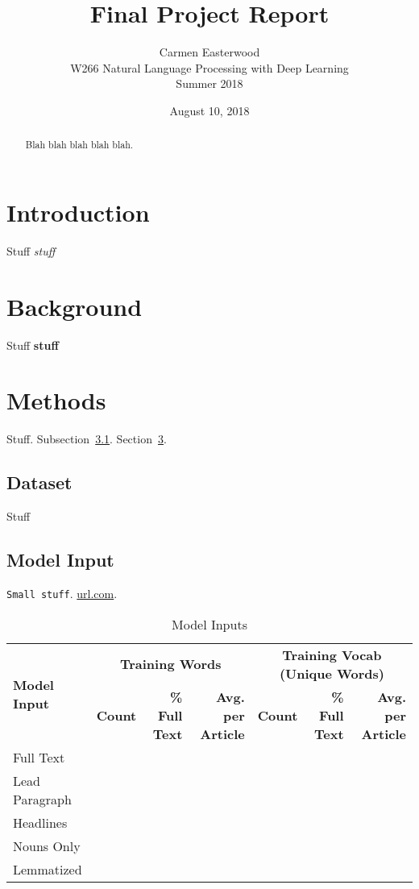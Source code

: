 \documentclass[11pt,a4paper]{article}
\title{Final Project Report}
\author{Carmen Easterwood \\
  W266 Natural Language Processing with Deep Learning \\
  Summer 2018 \\
}
\date{August 10, 2018}
\begin{document}
\maketitle

\begin{abstract}
Blah blah blah blah blah.
\end{abstract}

\section{Introduction}
\label{sec:intro}

Stuff {\em stuff}

\section{Background}
\label{sec:back}

Stuff \textbf{stuff}

\section{Methods}
\label{sec:methods}

Stuff. Subsection~\ref{ssec:dataset}. Section~\ref{sec:methods}.

\subsection{Dataset}
\label{ssec:dataset}

Stuff

\subsection{Model Input}
\label{ssec:input}

{\small\tt Small stuff}. \url{url.com}.

\begin{table}
\centering
\begin{tabular}{| l | r r r | r r r |}
	\hline
	\multirow{2}{*}{\textbf{Model Input}} & \multicolumn{3}{c|}{\textbf{Training Words}} & \multicolumn{3}{c|}{\textbf{Training Vocab (Unique Words)}} \\
	\cline{2-7}
	& \textbf{Count} & \textbf{\% Full Text} & \textbf{Avg. per Article} & \textbf{Count} & \textbf{\% Full Text} & \textbf{Avg. per Article} \\
	\hline
	Full Text & & & & & & \\
	Lead Paragraph & & & & & & \\
	Headlines	& & & & & & \\
	Nouns Only & & & & & & \\
	Lemmatized & & & & & & \\
	\hline
\end{tabular}
\caption{Model Inputs}
\end{table}
\end{document}
